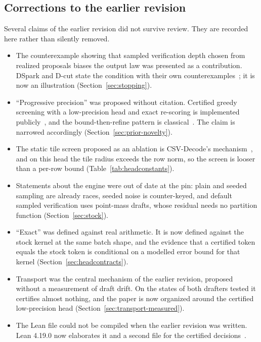\subsection{Corrections to the earlier revision}\label{app:corrections}
Several claims of the earlier revision did not survive review. They are recorded here rather than silently removed.
\begin{itemize}
\item The counterexample showing that sampled verification depth chosen from realized proposals biases the output law was presented as a contribution. DSpark and D-cut state the condition with their own counterexamples~\cite{dspark,dcut}; it is now an illustration (Section~\ref{sec:stopping}).
\item ``Progressive precision'' was proposed without citation. Certified greedy screening with a low-precision head and exact re-scoring is implemented publicly~\cite{sparkpipehead,dgpphead,lagunaprune,knlphead}, and the bound-then-refine pattern is classical~\cite{vafile,fexipro}. The claim is narrowed accordingly (Section~\ref{sec:prior-novelty}).
\item The static tile screen proposed as an ablation is CSV-Decode's mechanism~\cite{csvdecode}, and on this head the tile radius exceeds the row norm, so the screen is looser than a per-row bound (Table~\ref{tab:headconstants}).
\item Statements about the engine were out of date at the pin: plain and seeded sampling are already races, seeded noise is counter-keyed, and default sampled verification uses point-mass drafts, whose residual needs no partition function (Section~\ref{sec:stock}).
\item ``Exact'' was defined against real arithmetic. It is now defined against the stock kernel at the same batch shape, and the evidence that a certified token equals the stock token is conditional on a modelled error bound for that kernel (Section~\ref{sec:headcontracts}).
\item Transport was the central mechanism of the earlier revision, proposed without a measurement of draft drift. On the states of both drafters tested it certifies almost nothing, and the paper is now organized around the certified low-precision head (Section~\ref{sec:transport-measured}).
\item The Lean file could not be compiled when the earlier revision was written. Lean 4.19.0 now elaborates it and a second file for the certified decisions~.
\end{itemize}
